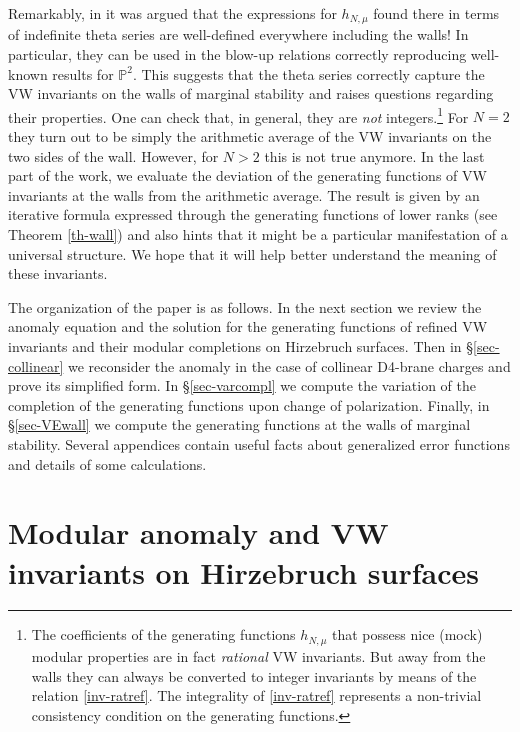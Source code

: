 \documentclass[12pt,letterpaper]{JHEP3}
\newcommand{\IP}{\mathds{P}}
\begin{document}
\begin{enumerate}
Remarkably, in \cite{Alexandrov:2020dyy} it was argued that the expressions for $h_{N,\mu}$ found there 
in terms of indefinite theta series are well-defined everywhere including the walls!
In particular, they can be used in the blow-up relations correctly reproducing well-known results for $\IP^2$.
This suggests that the theta series correctly capture the VW invariants on the walls of marginal stability and 
raises questions regarding their properties. One can check that, in general, 
they are {\it not} integers.\footnote{The coefficients of the generating functions $h_{N,\mu}$
	that possess nice (mock) modular properties are in fact {\it rational} VW invariants. 
	But away from the walls they can always be converted to integer invariants by means of the relation \eqref{inv-ratref}.
	The integrality of \eqref{inv-ratref} represents a non-trivial consistency condition on the generating functions.} 
For $N=2$ they turn out to be simply the arithmetic average of the VW invariants on the two sides of the wall.
However, for $N>2$ this is not true anymore.
In the last part of the work, we evaluate the deviation of the generating functions of VW invariants at the walls
from the arithmetic average. The result is given by an iterative formula expressed through the generating functions of lower ranks 
(see Theorem \ref{th-wall})
and also hints that it might be a particular manifestation of a universal structure.
We hope that it will help better understand the meaning of these invariants.


\end{enumerate}

The organization of the paper is as follows.
In the next section we review the anomaly equation and the solution for the generating functions of refined VW invariants and their 
modular completions on Hirzebruch surfaces.
Then in \S\ref{sec-collinear} we reconsider the anomaly in the case of collinear D4-brane charges
and prove its simplified form.
In \S\ref{sec-varcompl} we compute the variation of the completion of the generating functions upon change of polarization.
Finally, in \S\ref{sec-VEwall} we compute the generating functions at the walls of marginal stability.
Several appendices contain useful facts about generalized error functions and details of some calculations.




\section{Modular anomaly and VW invariants on Hirzebruch surfaces}
\label{sec-anomaly}
\end{document}
